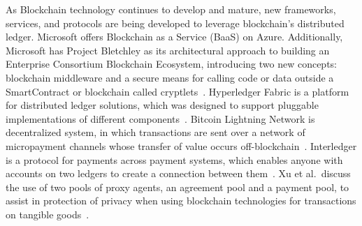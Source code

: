 As Blockchain technology continues to develop and mature, new
frameworks, services, and protocols are being developed to leverage
blockchain's distributed ledger. Microsoft offers Blockchain as a
Service (BaaS) on Azure. Additionally, Microsoft has Project Bletchley
as its architectural approach to building an Enterprise Consortium
Blockchain Ecosystem, introducing two new concepts: blockchain
middleware and a secure means for calling code or data outside a
SmartContract or blockchain called
cryptlets~\cite{gray2016introducing}. Hyperledger Fabric is a platform
for distributed ledger solutions, which was designed to support
pluggable implementations of different
components~\cite{hyperledger2017fabric}. Bitcoin Lightning Network is
decentralized system, in which transactions are sent over a network of
micropayment channels whose transfer of value occurs
off-blockchain~\cite{poon2016bitcoin}. Interledger is a protocol for
payments across payment systems, which enables anyone with accounts on
two ledgers to create a connection between
them~\cite{thomas_protocol}. Xu et al.\ discuss the use of two pools
of proxy agents, an agreement pool and a payment pool, to assist in
protection of privacy when using blockchain technologies for
transactions on tangible goods~\cite{Xu2017}.  \fi


